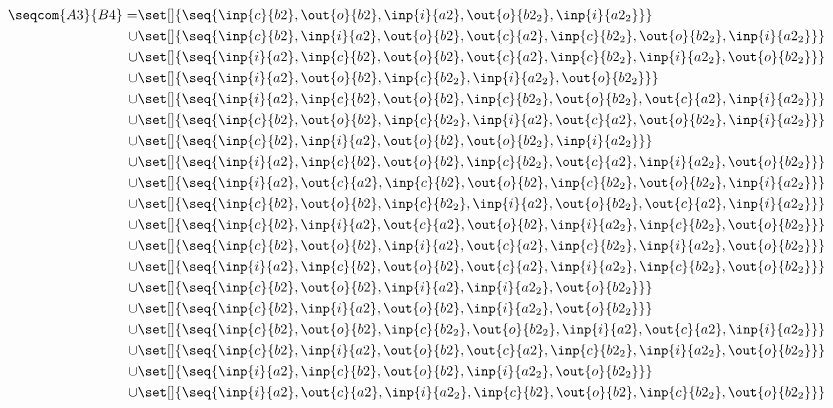 \begin{align*}
%
\seqcom{A3}{B4} = &\set[]{\seq{\inp{c}{b2},\out{o}{b2},\inp{i}{a2},\out{o}{b2_2},\inp{i}{a2_2}}}\\
\cup&\set[]{\seq{\inp{c}{b2},\inp{i}{a2},\out{o}{b2},\out{c}{a2},\inp{c}{b2_2},\out{o}{b2_2},\inp{i}{a2_2}}}\\
\cup&\set[]{\seq{\inp{i}{a2},\inp{c}{b2},\out{o}{b2},\out{c}{a2},\inp{c}{b2_2},\inp{i}{a2_2},\out{o}{b2_2}}}\\
\cup&\set[]{\seq{\inp{i}{a2},\out{o}{b2},\inp{c}{b2_2},\inp{i}{a2_2},\out{o}{b2_2}}}\\
\cup&\set[]{\seq{\inp{i}{a2},\inp{c}{b2},\out{o}{b2},\inp{c}{b2_2},\out{o}{b2_2},\out{c}{a2},\inp{i}{a2_2}}}\\
\cup&\set[]{\seq{\inp{c}{b2},\out{o}{b2},\inp{c}{b2_2},\inp{i}{a2},\out{c}{a2},\out{o}{b2_2},\inp{i}{a2_2}}}\\
\cup&\set[]{\seq{\inp{c}{b2},\inp{i}{a2},\out{o}{b2},\out{o}{b2_2},\inp{i}{a2_2}}}\\
\cup&\set[]{\seq{\inp{i}{a2},\inp{c}{b2},\out{o}{b2},\inp{c}{b2_2},\out{c}{a2},\inp{i}{a2_2},\out{o}{b2_2}}}\\
\cup&\set[]{\seq{\inp{i}{a2},\out{c}{a2},\inp{c}{b2},\out{o}{b2},\inp{c}{b2_2},\out{o}{b2_2},\inp{i}{a2_2}}}\\
\cup&\set[]{\seq{\inp{c}{b2},\out{o}{b2},\inp{c}{b2_2},\inp{i}{a2},\out{o}{b2_2},\out{c}{a2},\inp{i}{a2_2}}}\\
\cup&\set[]{\seq{\inp{c}{b2},\inp{i}{a2},\out{c}{a2},\out{o}{b2},\inp{i}{a2_2},\inp{c}{b2_2},\out{o}{b2_2}}}\\
\cup&\set[]{\seq{\inp{c}{b2},\out{o}{b2},\inp{i}{a2},\out{c}{a2},\inp{c}{b2_2},\inp{i}{a2_2},\out{o}{b2_2}}}\\
\cup&\set[]{\seq{\inp{i}{a2},\inp{c}{b2},\out{o}{b2},\out{c}{a2},\inp{i}{a2_2},\inp{c}{b2_2},\out{o}{b2_2}}}\\
\cup&\set[]{\seq{\inp{c}{b2},\out{o}{b2},\inp{i}{a2},\inp{i}{a2_2},\out{o}{b2_2}}}\\
\cup&\set[]{\seq{\inp{c}{b2},\inp{i}{a2},\out{o}{b2},\inp{i}{a2_2},\out{o}{b2_2}}}\\
\cup&\set[]{\seq{\inp{c}{b2},\out{o}{b2},\inp{c}{b2_2},\out{o}{b2_2},\inp{i}{a2},\out{c}{a2},\inp{i}{a2_2}}}\\
\cup&\set[]{\seq{\inp{c}{b2},\inp{i}{a2},\out{o}{b2},\out{c}{a2},\inp{c}{b2_2},\inp{i}{a2_2},\out{o}{b2_2}}}\\
\cup&\set[]{\seq{\inp{i}{a2},\inp{c}{b2},\out{o}{b2},\inp{i}{a2_2},\out{o}{b2_2}}}\\
\cup&\set[]{\seq{\inp{i}{a2},\out{c}{a2},\inp{i}{a2_2},\inp{c}{b2},\out{o}{b2},\inp{c}{b2_2},\out{o}{b2_2}}}\\

\end{align*}

